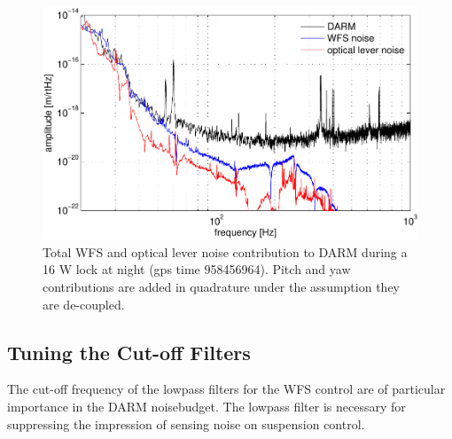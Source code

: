 \begin{figure}
\begin{centering}
\includegraphics[width=1.0\columnwidth]{figures/ASC2DARM.pdf}
\caption[Total WFS and optical lever noise contribution to DARM
  during a 16 W lock at night]{Total WFS and optical lever noise contribution to DARM
  during a 16 W lock at night (gps time 958456964). Pitch and yaw
  contributions are added in quadrature under the assumption they are
  de-coupled.}
\label{fig:}
\end{centering}
\end{figure}





\subsection{Tuning the Cut-off Filters} 
The cut-off frequency of the lowpass filters for the WFS control are
of particular importance in the DARM noisebudget. The lowpass filter
is necessary for suppressing the impression of sensing noise on
suspension control. 

